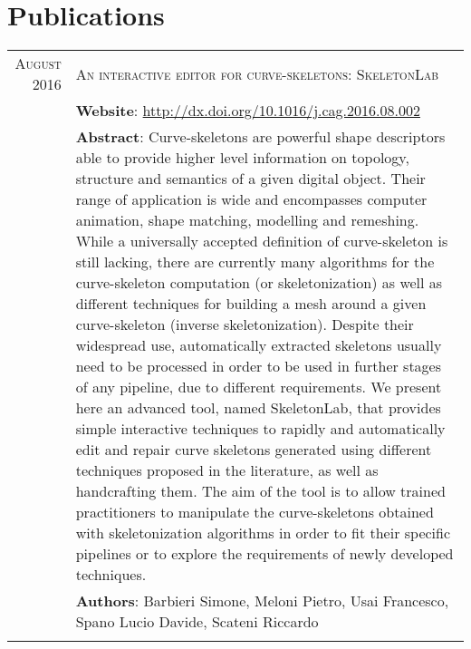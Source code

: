 \documentclass[a4paper,10pt]{article} %
\begin{document}
\section{Publications}
\begin{tabular}{rp{11cm}}
	
\textsc{August} 2016 & \textsc{An interactive editor for curve-skeletons: SkeletonLab}\\
& \textbf{Website}: \href{http://dx.doi.org/10.1016/j.cag.2016.08.002}{http://dx.doi.org/10.1016/j.cag.2016.08.002}\\
& \textbf{Abstract}: Curve-skeletons are powerful shape descriptors able to provide higher level information on topology, structure and semantics of a given digital object. Their range of application is wide and encompasses computer animation, shape matching, modelling and remeshing. While a universally accepted definition of curve-skeleton is still lacking, there are currently many algorithms for the curve-skeleton computation (or skeletonization) as well as different techniques for building a mesh around a given curve-skeleton (inverse skeletonization). Despite their widespread use, automatically extracted skeletons usually need to be processed in order to be used in further stages of any pipeline, due to different requirements. We present here an advanced tool, named SkeletonLab, that provides simple interactive techniques to rapidly and automatically edit and repair curve skeletons generated using different techniques proposed in the literature, as well as handcrafting them. The aim of the tool is to allow trained practitioners to manipulate the curve-skeletons obtained with skeletonization algorithms in order to fit their specific pipelines or to explore the requirements of newly developed techniques.\\
& \small \textbf{Authors}: Barbieri Simone, Meloni Pietro, Usai Francesco, Spano Lucio Davide, Scateni Riccardo\\
& \\
	

\end{tabular}
\end{document}

